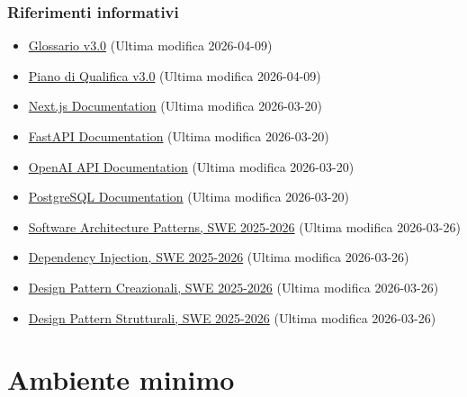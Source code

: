 \documentclass[a4paper, 11pt, oneside]{scrartcl}
\begin{document}
\subsubsection{Riferimenti informativi}
\begin{itemize}
    \item \href{https://swenightpro.github.io/Documentazione/docs/PB/Documentazione%20Esterna/Glossario.pdf}{Glossario v3.0} (Ultima modifica 2026-04-09)
    \item \href{https://swenightpro.github.io/Documentazione/docs/PB/Documentazione%20Esterna/Piano_Di_Qualifica.pdf}{Piano di Qualifica v3.0} (Ultima modifica 2026-04-09)
    \item \href{https://nextjs.org/docs}{Next.js Documentation} (Ultima modifica 2026-03-20)
    \item \href{https://fastapi.tiangolo.com/}{FastAPI Documentation} (Ultima modifica 2026-03-20)
    \item \href{https://platform.openai.com/docs}{OpenAI API Documentation} (Ultima modifica 2026-03-20)
    \item \href{https://www.postgresql.org/docs/}{PostgreSQL Documentation} (Ultima modifica 2026-03-20)
    \item \href{https://www.math.unipd.it/~rcardin/swea/2022/Software%20Architecture%20Patterns.pdf}{Software Architecture Patterns, SWE 2025-2026} (Ultima modifica 2026-03-26)
    \item \href{https://www.math.unipd.it/~rcardin/swea/2022/Design%20Pattern%20Architetturali%20-%20Dependency%20Injection.pdf}{Dependency Injection, SWE 2025-2026} (Ultima modifica 2026-03-26)
    \item \href{https://www.math.unipd.it/~rcardin/swea/2022/Design%20Pattern%20Creazionali.pdf}{Design Pattern Creazionali, SWE 2025-2026} (Ultima modifica 2026-03-26)
    \item \href{https://www.math.unipd.it/~rcardin/swea/2022/Design%20Pattern%20Strutturali.pdf}{Design Pattern Strutturali, SWE 2025-2026} (Ultima modifica 2026-03-26)

\end{itemize}

\newpage
\section{Ambiente minimo}
\end{document}
